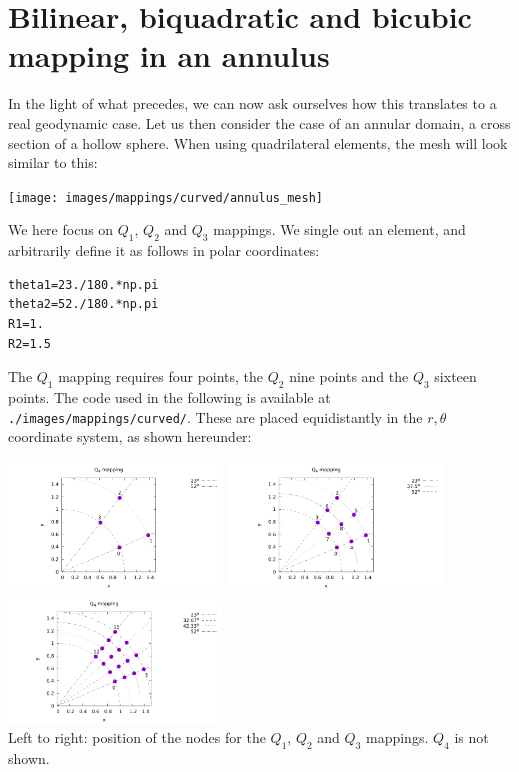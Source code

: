 \section{Bilinear, biquadratic and bicubic mapping in an annulus }

In the light of what precedes, we can now ask ourselves how this translates to 
a real geodynamic case. Let us then consider the case of an annular domain, 
a cross section of a hollow sphere. 
When using quadrilateral elements, the mesh will look similar to this:

\begin{center}
\texttt{[image: images/mappings/curved/annulus\_mesh]}
\end{center}

We here focus on $Q_1$, $Q_2$ and $Q_3$ mappings. We single out an element, 
and arbitrarily define it as follows in polar coordinates:
\begin{lstlisting}
theta1=23./180.*np.pi
theta2=52./180.*np.pi
R1=1.
R2=1.5
\end{lstlisting}
The $Q_1$ mapping requires four points, the $Q_2$ nine points and the $Q_3$
sixteen points. 
The code used in the following is available at {\tt ./images/mappings/curved/}.
These are placed equidistantly in the $r,\theta$ coordinate
system, as shown hereunder:

\begin{center}
\includegraphics[width=5.7cm]{images/mappings/curved/nodesQ1.pdf}
\includegraphics[width=5.7cm]{images/mappings/curved/nodesQ2.pdf}
\includegraphics[width=5.7cm]{images/mappings/curved/nodesQ3.pdf}\\
{\captionfont Left to right: position of the nodes for the $Q_1$, $Q_2$ and $Q_3$ mappings.
$Q_4$ is not shown.}
\end{center}

